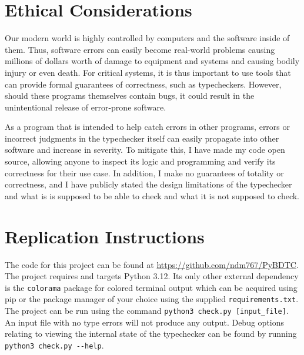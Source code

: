 \documentclass[10pt,twocolumn]{article}
\begin{document}
\section{Ethical Considerations}

Our modern world is highly controlled by computers and the software inside of them. Thus, software errors can easily become real-world problems causing millions of dollars worth of damage to equipment and systems and causing bodily injury or even death. For critical systems, it is thus important to use tools that can provide formal guarantees of correctness, such as typecheckers. However, should these programs themselves contain bugs, it could result in the unintentional release of error-prone software. 

As a program that is intended to help catch errors in other programs, errors or incorrect judgments in the typechecker itself can easily propagate into other software and increase in severity. To mitigate this, I have made my code open source, allowing anyone to inspect its logic and programming and verify its correctness for their use case. In addition, I make no guarantees of totality or correctness, and I have publicly stated the design limitations of the typechecker and what is is supposed to be able to check and what it is not supposed to check.

\appendix
\section{Replication Instructions}

The code for this project can be found at \url{https://github.com/ndm767/PyBDTC}. The project requires and targets Python 3.12. Its only other external dependency is the \verb|colorama| package for colored terminal output which can be acquired using pip or the package manager of your choice using the supplied \verb|requirements.txt|. The project can be run using the command \verb|python3 check.py [input_file]|. An input file with no type errors will not produce any output. Debug options relating to viewing the internal state of the typechecker can be found by running \verb|python3 check.py --help|.
\end{document}
